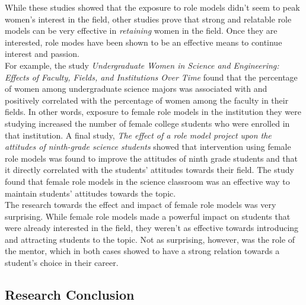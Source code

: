 \documentclass[12pt]{article}
\begin{document}
		While these studies showed that the exposure to role models didn't seem to peak women's interest in the field, other studies prove that strong and relatable role models can be very effective in \textit{retaining} women in the field. Once they are interested, role modes have been shown to be an effective means to continue interest and passion. \\
		
		For example, the study \textit{Undergraduate Women in Science and Engineering: Effects of Faculty, Fields, and Institutions Over Time} found that the percentage of women among undergraduate science majors was associated with and positively correlated with the percentage of women among the faculty in their fields. In other words, exposure to female role models in the institution they were studying increased the number of female college students who were enrolled in that institution. A final study, \textit{The effect of a role model project upon the attitudes of ninth-grade science students} showed that intervention using female role models was found to improve the attitudes of ninth grade students and that it directly correlated with the students' attitudes towards their field. The study found that female role models in the science classroom was an effective way to maintain students' attitudes towards the topic.\\
		
		The research towards the effect and impact of female role models was very surprising. While female role models made a powerful impact on students that were already interested in the field, they weren't as effective towards introducing and attracting students to the topic. Not as surprising, however, was the role of the mentor, which in both cases showed to have a strong relation towards a student's choice in their career. \\
		
	\pagebreak
	
	\subsection{Research Conclusion}
	
\end{document}
